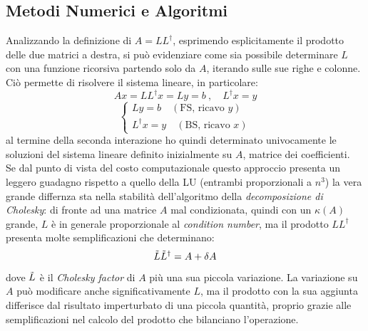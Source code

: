 \documentclass[11pt, a4paper]{article}
\begin{document}
\subsection{Metodi Numerici e Algoritmi}
Analizzando la definizione di $A=LL^\dagger$, esprimendo esplicitamente il prodotto delle due matrici a destra, si può evidenziare come sia possibile determinare $L$ con una funzione ricorsiva partendo solo da $A$, iterando sulle sue righe e colonne. Ciò permette di risolvere il sistema lineare, in particolare:
\[
Ax = LL^\dagger x = Ly = b\ , \quad L^\dagger x = y
\]
\[
\begin{cases}
    Ly = b \quad (\text{FS, ricavo $y$})\\
    L^\dagger x = y \quad (\text{BS, ricavo $x$})
\end{cases}
\]
al termine della seconda interazione ho quindi determinato univocamente le soluzioni del sistema lineare definito inizialmente su $A$, matrice dei coefficienti.
\\
Se dal punto di vista del costo computazionale questo approccio presenta un leggero guadagno rispetto a quello della LU (entrambi proporzionali a $n^3$) la vera grande differnza sta nella stabilità dell'algoritmo della \textit{decomposizione di Cholesky}: di fronte ad una matrice $A$ mal condizionata, quindi con un $\kappa(A)$ grande, $L$ è in generale proporzionale al \textit{condition number}, ma il prodotto $LL^\dagger$ presenta molte semplificazioni che determinano:
\[
\Tilde{L}\Tilde{L}^\dagger = A + \delta A
\]
dove $\Tilde{L}$ è il \textit{Cholesky factor} di $A$ più una sua piccola variazione. La variazione su $A$ può modificare anche significativamente $L$, ma il prodotto con la sua aggiunta differisce dal risultato imperturbato di una piccola quantità, proprio grazie alle semplificazioni nel calcolo del prodotto che bilanciano l'operazione.
\end{document}
